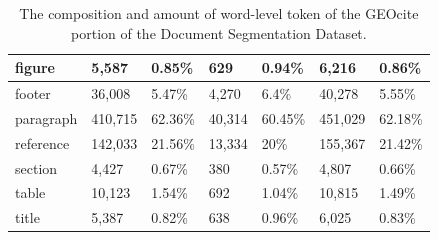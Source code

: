 \begin{table}[!ht]
\begin{tabular}{l|llllll|}
\multicolumn{1}{|l|}{figure}         & \multicolumn{1}{l|}{\cellcolor[HTML]{DAE8FC}5,587}          & \multicolumn{1}{l|}{\cellcolor[HTML]{EFEFEF}0.85\%}    & \multicolumn{1}{l|}{\cellcolor[HTML]{DAE8FC}629}           & \multicolumn{1}{l|}{\cellcolor[HTML]{EFEFEF}0.94\%}    & \multicolumn{1}{l|}{\cellcolor[HTML]{DAE8FC}6,216}          & \cellcolor[HTML]{EFEFEF}0.86\%    \\ \hline
\multicolumn{1}{|l|}{footer}         & \multicolumn{1}{l|}{\cellcolor[HTML]{DAE8FC}36,008}         & \multicolumn{1}{l|}{\cellcolor[HTML]{EFEFEF}5.47\%}    & \multicolumn{1}{l|}{\cellcolor[HTML]{DAE8FC}4,270}         & \multicolumn{1}{l|}{\cellcolor[HTML]{EFEFEF}6.4\%}     & \multicolumn{1}{l|}{\cellcolor[HTML]{DAE8FC}40,278}         & \cellcolor[HTML]{EFEFEF}5.55\%    \\ \hline
\multicolumn{1}{|l|}{paragraph}      & \multicolumn{1}{l|}{\cellcolor[HTML]{DAE8FC}410,715}        & \multicolumn{1}{l|}{\cellcolor[HTML]{EFEFEF}62.36\%}   & \multicolumn{1}{l|}{\cellcolor[HTML]{DAE8FC}40,314}        & \multicolumn{1}{l|}{\cellcolor[HTML]{EFEFEF}60.45\%}   & \multicolumn{1}{l|}{\cellcolor[HTML]{DAE8FC}451,029}        & \cellcolor[HTML]{EFEFEF}62.18\%   \\ \hline
\multicolumn{1}{|l|}{reference}      & \multicolumn{1}{l|}{\cellcolor[HTML]{DAE8FC}142,033}        & \multicolumn{1}{l|}{\cellcolor[HTML]{EFEFEF}21.56\%}   & \multicolumn{1}{l|}{\cellcolor[HTML]{DAE8FC}13,334}        & \multicolumn{1}{l|}{\cellcolor[HTML]{EFEFEF}20\%}      & \multicolumn{1}{l|}{\cellcolor[HTML]{DAE8FC}155,367}        & \cellcolor[HTML]{EFEFEF}21.42\%   \\ \hline
\multicolumn{1}{|l|}{section}        & \multicolumn{1}{l|}{\cellcolor[HTML]{DAE8FC}4,427}          & \multicolumn{1}{l|}{\cellcolor[HTML]{EFEFEF}0.67\%}    & \multicolumn{1}{l|}{\cellcolor[HTML]{DAE8FC}380}           & \multicolumn{1}{l|}{\cellcolor[HTML]{EFEFEF}0.57\%}    & \multicolumn{1}{l|}{\cellcolor[HTML]{DAE8FC}4,807}          & \cellcolor[HTML]{EFEFEF}0.66\%    \\ \hline
\multicolumn{1}{|l|}{table}          & \multicolumn{1}{l|}{\cellcolor[HTML]{DAE8FC}10,123}         & \multicolumn{1}{l|}{\cellcolor[HTML]{EFEFEF}1.54\%}    & \multicolumn{1}{l|}{\cellcolor[HTML]{DAE8FC}692}           & \multicolumn{1}{l|}{\cellcolor[HTML]{EFEFEF}1.04\%}    & \multicolumn{1}{l|}{\cellcolor[HTML]{DAE8FC}10,815}         & \cellcolor[HTML]{EFEFEF}1.49\%    \\ \hline
\multicolumn{1}{|l|}{title}          & \multicolumn{1}{l|}{\cellcolor[HTML]{DAE8FC}5,387}          & \multicolumn{1}{l|}{\cellcolor[HTML]{EFEFEF}0.82\%}    & \multicolumn{1}{l|}{\cellcolor[HTML]{DAE8FC}638}           & \multicolumn{1}{l|}{\cellcolor[HTML]{EFEFEF}0.96\%}    & \multicolumn{1}{l|}{\cellcolor[HTML]{DAE8FC}6,025}          & \cellcolor[HTML]{EFEFEF}0.83\%    \\ \hline
\end{tabular}
\caption{The composition and amount of word-level token of the GEOcite portion of the Document Segmentation Dataset.}
\label{tab:dataset_docseg_geocite}
\end{table}

